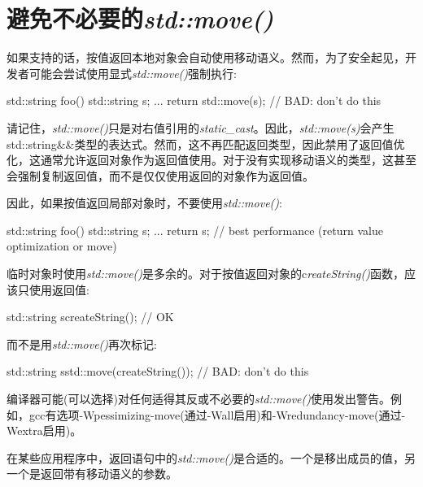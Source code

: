 \section{避免不必要的\textit{std::move()}}
如果支持的话，按值返回本地对象会自动使用移动语义。然而，为了安全起见，开发者可能会尝试使用显式\textit{std::move()}强制执行:

\begin{cppcode}
std::string foo()
{
	std::string s;
	...
	return std::move(s); // BAD: don’t do this
}
\end{cppcode}

请记住，\textit{std::move()}只是对右值引用的\textit{static_cast}。因此，\textit{std::move(s)}会产生std::string\&\&类型的表达式。然而，这不再匹配返回类型，因此禁用了返回值优化，这通常允许返回对象作为返回值使用。对于没有实现移动语义的类型，这甚至会强制复制返回值，而不是仅仅使用返回的对象作为返回值。

因此，如果按值返回局部对象时，不要使用\textit{std::move()}:

\begin{cppcode}
std::string foo()
{
	std::string s;
	...
	return s; // best performance (return value optimization or move)
}
\end{cppcode}

临时对象时使用\textit{std::move()}是多余的。对于按值返回对象的c\textit{reateString()}函数，应该只使用返回值:

\begin{cppcode}
std::string s{createString()}; // OK
\end{cppcode}

而不是用\textit{std::move()}再次标记:

\begin{cppcode}
std::string s{std::move(createString())}; // BAD: don’t do this
\end{cppcode}

编译器可能(可以选择)对任何适得其反或不必要的\textit{std::move()}使用发出警告。例如，gcc有选项-Wpessimizing-move(通过-Wall启用)和-Wredundancy-move(通过-Wextra启用)。

在某些应用程序中，返回语句中的\textit{std::move()}是合适的。一个是移出成员的值，另一个是返回带有移动语义的参数。

















